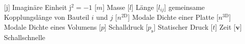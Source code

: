 \begin{acronym}[-------------------]
{	} %
		[$\mathrm{j}$]		{\acrounit{-}
		Imaginäre Einheit $\mathrm{j}^2=-1$
	} %
		[$m$]				{\acrounit{\kg}
		Masse
	} %
		[$l$]				{\acrounit{\m}
		Länge
	} %
		[$ l_{ij} $]		{\acrounit{\m}
		gemeinsame Kopplungslänge von Bauteil $i$ und $j$ 
	}
		[$n^{\mathrm{2D}}$]	{\acrounit{\radian\per\s}
		Modale Dichte einer Platte
	}
		[$n^{\mathrm{3D}}$]	{\acrounit{\radian\per\s}
		Modale Dichte eines Volumens
	}
		[$p$]				{\acrounit{\pascal}
		Schalldruck
	} %
		[$p_\mathrm{s}$]	{\acrounit{\pascal}
		Statischer Druck
	} %
		[$t$]				{\acrounit{\s}
		Zeit
	} %
		[$\mathbf{v}$]		{\acrounit{\m\per\s}
		Schallschnelle
	} %
\end{acronym}
%
% 
%
%
%
%
%
%
%
% 

